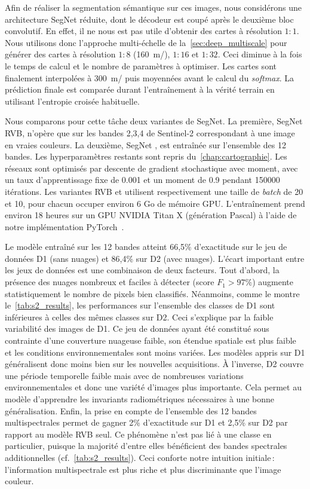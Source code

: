 Afin de réaliser la segmentation sémantique sur ces images, nous considérons une architecture SegNet réduite, dont le décodeur est coupé après le deuxième bloc convolutif. En effet, il ne nous est pas utile d'obtenir des cartes à résolution $1:1$. Nous utilisons donc l'approche multi-échelle de la~\cref{sec:deep_multiscale} pour générer des cartes à résolution $1:8$ (\SI{160}{\meter/\px}), $1:16$ et $1:32$. Ceci diminue à la fois le temps de calcul et le nombre de paramètres à optimiser. Les cartes sont finalement interpolées à \SI{300}{\meter/\px} puis moyennées avant le calcul du \emph{softmax}. La prédiction finale est comparée durant l'entraînement à la vérité terrain en utilisant l'entropie croisée habituelle.

Nous comparons pour cette tâche deux variantes de SegNet. La première, SegNet \gls{RVB}, n'opère que sur les bandes 2,3,4 de Sentinel-2 correspondant à une image en vraies couleurs. La deuxième, SegNet , est entraînée sur l'ensemble des 12 bandes. Les hyperparamètres restants sont repris du~\cref{chap:cartographie}. Les réseaux sont optimisés par descente de gradient stochastique avec moment, avec un taux d'apprentissage fixe de \num{0,001} et un moment de \num{0,9} pendant \num{150000} itérations. Les variantes \gls{RVB} et  utilisent respectivement une taille de \emph{batch} de 20 et 10, pour chacun occuper environ 6 Go de mémoire \gls{GPU}. L'entraînement prend environ 18 heures sur un \gls{GPU} NVIDIA Titan X (génération Pascal) à l'aide de notre implémentation \gls{PyTorch}~\cite{noauthor_pytorch_2016}.

Le modèle entraîné sur les 12 bandes atteint 66,5\% d'exactitude sur le jeu de données D1 (sans nuages) et 86,4\% sur D2 (avec nuages). L'écart important entre les jeux de données est une combinaison de deux facteurs. Tout d'abord, la présence des nuages nombreux et faciles à détecter (score $F_1 > 97\%$) augmente statistiquement le nombre de pixels bien classifiés. Néanmoins, comme le montre le~\cref{tab:s2_results}, les performances sur l'ensemble des classes de D1 sont inférieures à celles des mêmes classes sur D2. Ceci s'explique par la faible variabilité des images de D1. Ce jeu de données ayant été constitué sous contrainte d'une couverture nuageuse faible, son étendue spatiale est plus faible et les conditions environnementales sont moins variées. Les modèles appris sur D1 généralisent donc moins bien sur les nouvelles acquisitions. À l'inverse, D2 couvre une période temporelle faible mais avec de nombreuses variations environnementales et donc une variété d'images plus importante. Cela permet au modèle d'apprendre les invariants radiométriques nécessaires à une bonne généralisation.
Enfin, la prise en compte de l'ensemble des 12 bandes multispectrales permet de gagner 2\% d'exactitude sur D1 et 2,5\% sur D2 par rapport au modèle \gls{RVB} seul. Ce phénomène n'est pas lié à une classe en particulier, puisque la majorité d'entre elles bénéficient des bandes spectrales additionnelles (cf.~\cref{tab:s2_results}). Ceci conforte notre intuition initiale\,: l'information multispectrale est plus riche et plus discriminante que l'image couleur.

